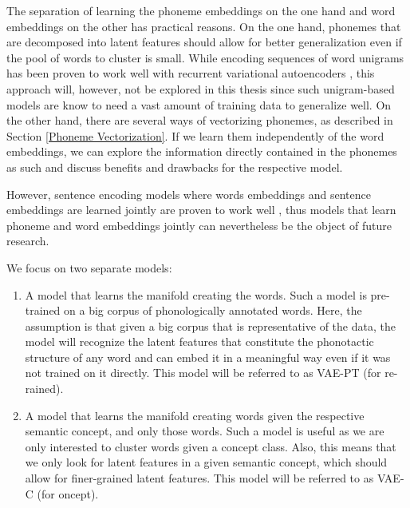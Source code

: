 \documentclass[6pt]{article}
\begin{document}
The separation of learning the phoneme embeddings on the one hand and word embeddings on the other has practical reasons. On the one hand, phonemes that are decomposed into latent features should allow for better generalization even if the pool of words to cluster is small. While encoding sequences of word unigrams has been proven to work well with recurrent variational autoencoders \citep{bowman2015generating}, this approach will, however, not be explored in this thesis since such unigram-based models are know to need a vast amount of training data to generalize well. On the other hand, there are several ways of vectorizing phonemes, as described in Section \ref{Phoneme Vectorization}. If we learn them independently of the word embeddings, we can explore the information directly contained in the phonemes as such and discuss benefits and drawbacks for the respective model.

However, sentence encoding models where words embeddings and sentence embeddings are learned jointly are proven to work well \cite{kiros2015skip}, thus models that learn phoneme and word embeddings jointly can nevertheless be the object of future research.


We focus on two separate models:
\begin{enumerate}
\item A model that learns the manifold creating the words. Such a model is pre-trained on a big corpus of phonologically annotated words. Here, the assumption is that given a big corpus that is representative of the data, the model will recognize the latent features that constitute the phonotactic structure of any word and can embed it in a meaningful way even if it was not trained on it directly. This model will be referred to as VAE-PT (for re-rained).
\item A model that learns the manifold creating words given the respective semantic concept, and only those words. Such a model is useful as we are only interested to cluster words given a concept class. Also, this means that we only look for latent features in a given semantic concept, which should allow for finer-grained latent features. This model will be referred to as VAE-C (for oncept).
\end{enumerate}
\end{document}

